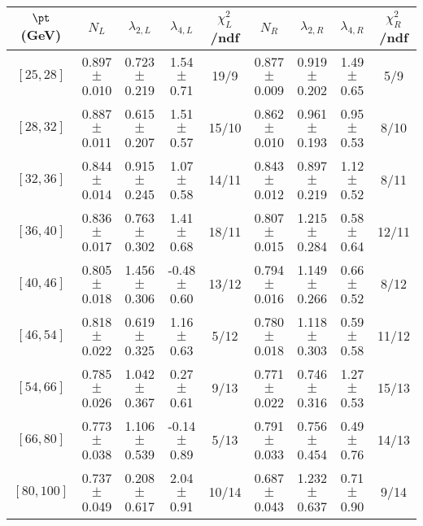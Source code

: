 \begin{tabular}{c||c|c|c|c||c|c|c|c}
$\pt$ (GeV) & $N_L$ & $\lambda_{2,L}$ & $\lambda_{4,L}$  & $\chi^2_L$/ndf & $N_R$ & $\lambda_{2,R}$ & $\lambda_{4,R}$  & $\chi^2_R$/ndf \\
\hline
$[25, 28]$ & 0.897$\pm$0.010 & 0.723$\pm$0.219 & 1.54$\pm$0.71 & 19/9 & 0.877$\pm$0.009 & 0.919$\pm$0.202 & 1.49$\pm$0.65 & 5/9\\
$[28, 32]$ & 0.887$\pm$0.011 & 0.615$\pm$0.207 & 1.51$\pm$0.57 & 15/10 & 0.862$\pm$0.010 & 0.961$\pm$0.193 & 0.95$\pm$0.53 & 8/10\\
$[32, 36]$ & 0.844$\pm$0.014 & 0.915$\pm$0.245 & 1.07$\pm$0.58 & 14/11 & 0.843$\pm$0.012 & 0.897$\pm$0.219 & 1.12$\pm$0.52 & 8/11\\
$[36, 40]$ & 0.836$\pm$0.017 & 0.763$\pm$0.302 & 1.41$\pm$0.68 & 18/11 & 0.807$\pm$0.015 & 1.215$\pm$0.284 & 0.58$\pm$0.64 & 12/11\\
$[40, 46]$ & 0.805$\pm$0.018 & 1.456$\pm$0.306 & -0.48$\pm$0.60 & 13/12 & 0.794$\pm$0.016 & 1.149$\pm$0.266 & 0.66$\pm$0.52 & 8/12\\
$[46, 54]$ & 0.818$\pm$0.022 & 0.619$\pm$0.325 & 1.16$\pm$0.63 & 5/12 & 0.780$\pm$0.018 & 1.118$\pm$0.303 & 0.59$\pm$0.58 & 11/12\\
$[54, 66]$ & 0.785$\pm$0.026 & 1.042$\pm$0.367 & 0.27$\pm$0.61 & 9/13 & 0.771$\pm$0.022 & 0.746$\pm$0.316 & 1.27$\pm$0.53 & 15/13\\
$[66, 80]$ & 0.773$\pm$0.038 & 1.106$\pm$0.539 & -0.14$\pm$0.89 & 5/13 & 0.791$\pm$0.033 & 0.756$\pm$0.454 & 0.49$\pm$0.76 & 14/13\\
$[80, 100]$ & 0.737$\pm$0.049 & 0.208$\pm$0.617 & 2.04$\pm$0.91 & 10/14 & 0.687$\pm$0.043 & 1.232$\pm$0.637 & 0.71$\pm$0.90 & 9/14\\
\end{tabular}
